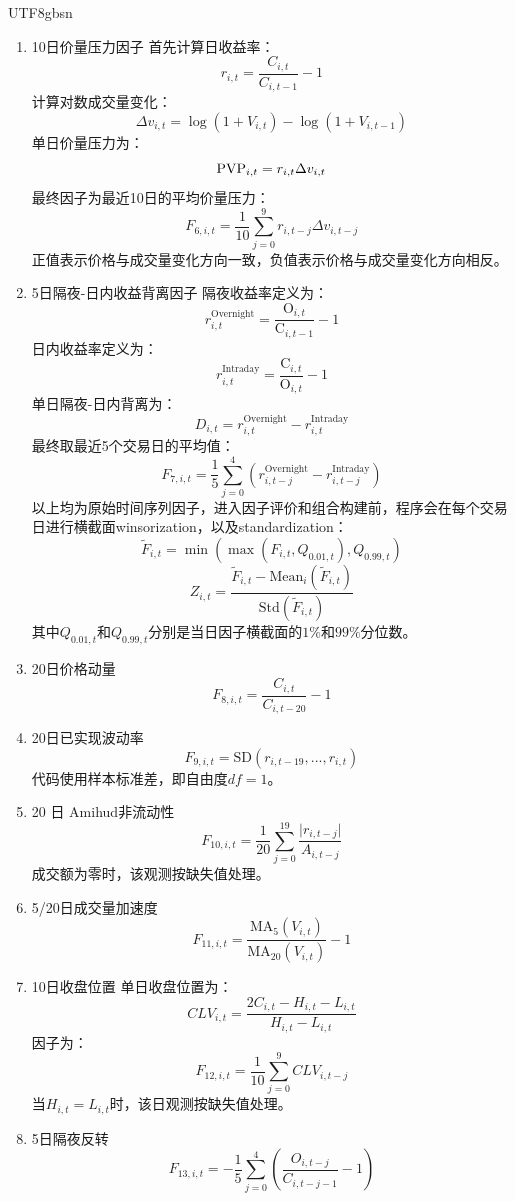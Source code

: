 \documentclass[a4paper,11pt,openany]{report}
\begin{document}
\begin{CJK*}{UTF8}{gbsn}
\begin{enumerate}[label=\roman*)]
    \item 10日价量压力因子
    首先计算日收益率：
    $$r_{i,t}=\frac{C_{i,t}}{C_{i,t-1}}-1$$
    计算对数成交量变化：
    $$\Delta v_{i,t}=\log(1+V_{i,t})-\log(1+V_{i,t-1})$$
    单日价量压力为：
    $$\mathrm{PV}\space\mathrm{P}_{i,t}=r_{i,t}\Delta v_{i,t}$$
    最终因子为最近10日的平均价量压力：
    $$F_{6,i,t}=\frac{1}{10}\sum^{9}_{j=0} r_{i,t-j} \Delta v_{i,t-j}$$
    正值表示价格与成交量变化方向一致，负值表示价格与成交量变化方向相反。

    \item 5日隔夜-日内收益背离因子
    隔夜收益率定义为：
    $$r^{\mathrm{Overnight}}_{i,t}=\frac{\mathrm{O}_{i,t}}{\mathrm{C}_{i,t-1}}-1$$
    日内收益率定义为：
    $$r^{\mathrm{Intraday}}_{i,t}=\frac{\mathrm{C}_{i,t}}{\mathrm{O}_{i,t}}-1$$
    单日隔夜-日内背离为：
    $$D_{i,t}=r^{\mathrm{Overnight}}_{i,t}-r^{\mathrm{Intraday}}_{i,t}$$
    最终取最近5个交易日的平均值：
    $$F_{7,i,t}=\frac{1}{5}\sum^{4}_{j=0}(r^{\mathrm{Overnight}}_{i,t-j}-r^{\mathrm{Intraday}}_{i,t-j})$$
    以上均为原始时间序列因子，进入因子评价和组合构建前，程序会在每个交易日进行横截面winsorization，以及standardization：
    $$\tilde{F}_{i,t}=\min(\max(F_{i,t},Q_{0.01,t}),Q_{0.99,t})$$
    $$Z_{i,t}=\frac{\tilde{F}_{i,t}-\mathrm{Mean}_{i}(\tilde{F}_{i,t})}{\mathrm{Std}(\tilde{F}_{i,t})}$$
    其中$Q_{0.01,t}$和$Q_{0.99,t}$分别是当日因子横截面的$1\%$和$99\%$分位数。

    \item 20日价格动量
    $$F_{8,i,t}=\frac{C_{i,t}}{C_{i,t-20}}-1$$

    \item 20日已实现波动率
    $$F_{9,i,t}=\mathrm{SD}(r_{i,t-19},...,r_{i,t})$$
    代码使用样本标准差，即自由度$df=1$。

    \item 20 日 Amihud非流动性
    $$F_{10,i,t}=\frac{1}{20}\sum_{j=0}^{19}\frac{\lvert r_{i,t-j} \rvert}{A_{i,t-j}}$$
    成交额为零时，该观测按缺失值处理。

    \item 5/20日成交量加速度
    $$F_{11,i,t}=\frac{\mathrm{MA}_{5}(V_{i,t})}{\mathrm{MA}_{20}(V_{i,t})}-1$$

    \item 10日收盘位置
    单日收盘位置为：
    $$CLV_{i,t}=\frac{2C_{i,t}-H_{i,t}-L_{i,t}}{H_{i,t}-L_{i,t}}$$
    因子为：
    $$F_{12,i,t}=\frac{1}{10}\sum_{j=0}^{9}CLV_{i,t-j}$$
    当$H_{i,t}=L_{i,t}$时，该日观测按缺失值处理。

    \item 5日隔夜反转
    $$F_{13,i,t}=-\frac{1}{5}\sum_{j=0}^{4}\left(\frac{O_{i,t-j}}{C_{i,t-j-1}}-1\right)$$


\end{enumerate}
\end{CJK*}
\end{document}
